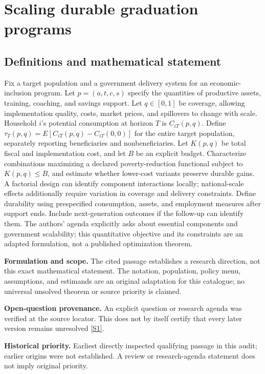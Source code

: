 \documentclass[11pt]{article}
\newcommand{\sref}[2]{\hyperlink{source:#1:#2}{[S#2]}}
\begin{document}
\section*{Scaling durable graduation programs}\label{30007653}
\subsection{Definitions and mathematical statement}
Fix a target population and a government delivery system for an economic-inclusion program. Let \(p=(a,t,c,s)\) specify the quantities of productive assets, training, coaching, and savings support. Let \(q\in[0,1]\) be coverage, allowing implementation quality, costs, market prices, and spillovers to change with scale. Household \(i\)'s potential consumption at horizon \(T\) is \(C_{iT}(p,q)\). Define \(\tau_T(p,q)=E[C_{iT}(p,q)-C_{iT}(0,0)]\) for the entire target population, separately reporting beneficiaries and nonbeneficiaries. Let \(K(p,q)\) be total fiscal and implementation cost, and let \(B\) be an explicit budget. Characterize combinations maximizing a declared poverty-reduction functional subject to \(K(p,q)\le B\), and estimate whether lower-cost variants preserve durable gains. A factorial design can identify component interactions locally; national-scale effects additionally require variation in coverage and delivery constraints. Define durability using prespecified consumption, assets, and employment measures after support ends. Include next-generation outcomes if the follow-up can identify them. The authors' agenda explicitly asks about essential components and government scalability; this quantitative objective and its constraints are an adapted formulation, not a published optimization theorem.

\par\textbf{Formulation and scope.} The cited passage establishes a research direction, not this exact mathematical statement. The notation, population, policy menu, assumptions, and estimands are an original adaptation for this catalogue; no universal unsolved theorem or source priority is claimed.

\par\textbf{Open-question provenance.} An explicit question or research agenda was verified at the source locator. This does not by itself certify that every later version remains unresolved \sref{30007653}{1}.

\par\textbf{Historical priority.} Earliest directly inspected qualifying passage in this audit; earlier origins were not established. A review or research-agenda statement does not imply original priority.
\end{document}
